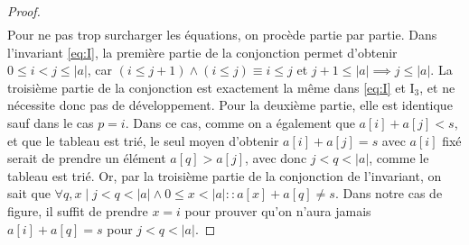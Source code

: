 \documentclass{elsarticle}
\newcommand{\abs}[1]{\left\lvert#1\right\lvert}
\begin{document}
\begin{minipage}[c]{0.65\textwidth}
\begin{proof}
\begin{align*}
\end{align*}
Pour ne pas trop surcharger les équations, on procède partie par partie.
Dans l'invariant \ref{eq:I}, la première partie de la conjonction permet d'obtenir $0 \le i < j \le \abs{a}$,
car $(i \le j+1) \land (i \le j) \equiv i \le j$ et $j+1 \le \abs{a} \implies j \le \abs{a}$.
La troisième partie de la conjonction est exactement la même dans \ref{eq:I} et I$_3$,
et ne nécessite donc pas de développement.
Pour la deuxième partie, elle est identique sauf dans le cas $p = i$.
Dans ce cas, comme on a également que $a[i] + a[j] < s$,
et que le tableau est trié, le seul moyen d'obtenir $a[i] + a[j] = s$ avec $a[i]$ fixé serait de prendre un élément $a[q] > a[j]$, avec donc $j  < q < \abs{a}$, comme le tableau est trié.
Or, par la troisième partie de la conjonction de l'invariant, on sait que $\forall q, x \mid j < q < \abs{a} \land 0 \le x < \abs{a} :: a[x] + a[q] \ne s$.
Dans notre cas de figure, il suffit de prendre $x = i$ pour prouver qu'on n'aura jamais $a[i] + a[q] = s$ pour $j < q < \abs{a}$.
\end{proof}
\end{minipage}
\end{document}
